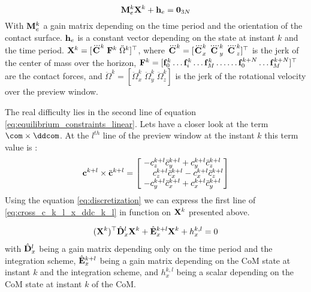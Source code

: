 \begin{equation}
{\bf M}^k_{e} {\bf X}^k+{\bf h}_e = {\bf 0}_{3N}
\end{equation}
%
With $ {\bf M}^k_{e} $ a gain matrix depending on the time period and the orientation of the contact surface. $ {\bf h}_e $ is a constant vector depending on the state at instant $k$ and the time period. 
${\bf X}^k = [ \dddot{\bf C}^k \; {\bf F}^k \; \ddot{\Omega}^k ]^{\top}$, where
$ \dddot{\bf C}^k = [\dddot{\bf C}^k_x \; \ddddot{\bf C}^k_y \; \ddddot{\bf C}^k_z ]^{\top}$ is the jerk of the center of mass over 
the horizon,
${\bf F}^k= [ {\bf f}^k_0 \dots {\bf f}^k_i \dots {\bf f}^k_M \dots \dots {\bf f}^{k+N}_0 \dots {\bf f}^{k+N}_M ]^{\top}$ are the contact forces, and $\ddot{\Omega}^k=[\ddot{\Omega}_x^k \; \ddot{\Omega}_y^k \; \ddot{\Omega}_z^k] $ is the jerk of the rotational velocity over the preview window.

The real difficulty lies in the second line of equation \eqref{eq:equilibrium_constraints_linear}. Lets have a closer look at the term $ \com \times \ddcom $.
At the $l^{th}$ line of the preview window at the instant $k$ this term value is :
\begin{equation}
 {\bf c}^{k+l} \times \ddot{\bf c}^{k+l}= 
\left[
  \begin{matrix}
    -c^{k+l}_z \ddot{c}^{k+l}_y + c^{k+l}_y \ddot{c}^{k+l}_z \\
    \;\;\;\;\;c^{k+l}_z \ddot{c}^{k+l}_x - c^{k+l}_x \ddot{c}^{k+l}_z \\
    -c^{k+l}_y \ddot{c}^{k+l}_x + c^{k+l}_x \ddot{c}^{k+l}_y \\
  \end{matrix}
\right]
\label{eq:cross_c_k_l_x_ddc_k_l}
\end{equation}
Using the equation \eqref{eq:discretization} we can express the first line of \eqref{eq:cross_c_k_l_x_ddc_k_l} in function on $ {\bf X}^k $ presented above.

\begin{align}
({\bf X}^k)^{\top} \hat{\bf D}_x^l {\bf X}^k + 
%
\hat{\bf E}_x^{k+l} {\bf X}^k +
%
h_x^{k,l} =  0
\label{eq:quadratic_equality_constraint}
\end{align}
with
$ \hat{\bf D}_x^l $ being a gain matrix depending only on the time period and the integration scheme,
$ \hat{\bf E}_x^{k+l} $ being a gain matrix depending on the CoM state at instant $k$ and the integration scheme, and
$ h_x^{k,l} $ being a scalar depending on the CoM state at instant $k$ of the CoM.

